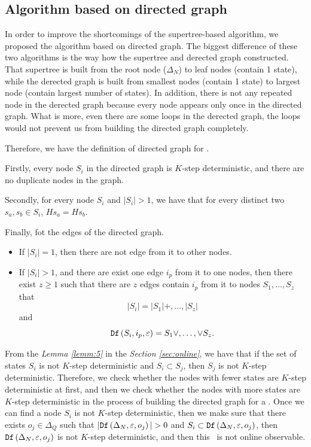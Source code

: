 \subsection{Algorithm based on directed graph}
In order to improve the shortcomings of the supertree-based algorithm, we proposed the algorithm based on directed graph. The biggest difference of these two algorithms is the way how the  supertree and derected graph constructed. That supertree is built from the root node ($\Delta_N$) to leaf nodes (contain 1 state), while the derected graph is built from smallest nodes (contain 1 state) to largest node (contain largest number of states). In addition, there is not any repeated node in the derected graph because every node appears only once in the directed graph. What is more, even there are some loops in the derected graph, the loops would not prevent us from building the directed graph completely.

Therefore, we have the definition of directed graph for \BCNs.
\begin{definition}
Firstly, every node $S_i$ in the directed graph is $K$-step deterministic, and there are no duplicate nodes in the graph. 

Secondly, for every node $S_i$  and $|S_i|>1$, we have that for every distinct two $s_a, s_b \in S_i$, $Hs_a=Hs_b$. 

Finally, fot the edges of the directed graph. 
\begin{itemize}
 \item If $|S_i|=1$, then there are not edge from it to other nodes.
 \item  If $|S_i|>1$, and there are exist one edge $i_p$ from it to one nodes, then there exist $z\ge 1$ such that there are $z$ edges contain $i_p$ from it to nodes $S_1,\ldots,S_z$ that \[|S_i|= |S_1|+,\ldots,|S_z|\] and \[{\tt Df}\left(S_i,i_p,\varepsilon\right)=S_1\vee,\ldots,\vee S_z.\]
 \end{itemize}

\end{definition}

From the {\em Lemma \ref{lemm:5}} in the {\em Section \ref{sec:online}}, we have that if the set of states $S_i$ is not $K$-step deterministic and $S_i\subset S_j$, then $S_j$ is not $K$-step deterministic. Therefore, we check whether the nodes with fewer states are $K$-step deterministic at first, and then we check whether the nodes with more states are $K$-step deterministic in the process of building the directed graph for a \BCN. Once we can find a node $S_i$ is not $K$-step deterministic, then we make sure that there exists $o_j \in \Delta_Q$ such that $|\Ded\left(\Delta_N,\varepsilon, o_j\right)|> 0$ and $S_i\subset {\tt Df}\left(\Delta_N,\varepsilon, o_j\right)$, then ${\tt Df}\left(\Delta_N,\varepsilon,o_j\right)$ is not $K$-step deterministic, and then this \BCN\ is not online observable. %

